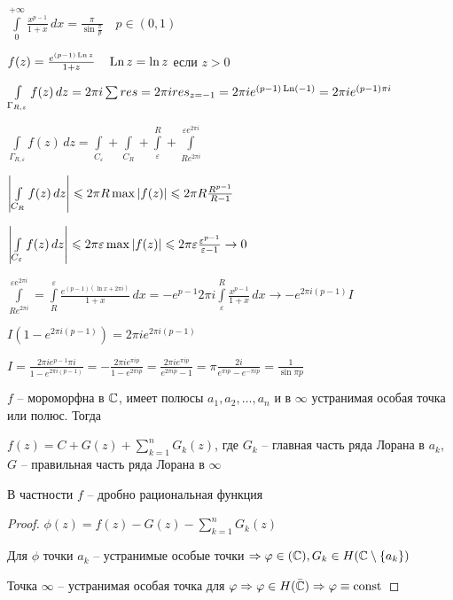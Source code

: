 \begin{example}\thmslashn
	
	$\int\limits_{0}^{+\infty}\frac{x^{p-1}}{1+x} \,dx = \frac{\pi}{\sin \frac{\pi}{p}}\quad p\in (0 ,1)$
	
	$f(z) = \frac{e^{(p-1)\operatorname{Ln} z}}{1+ z} \quad \operatorname{Ln} z = \ln z$ если $z > 0$ 
	
	$\int\limits_{\Gamma_{R, \varepsilon}} f(z)\,dz = 2\pi i \sum res = 2\pi i res_{z = -1} = 2\pi i e^{(p-1)\operatorname{Ln} (-1)} = 2\pi i e^{(p-1)\pi i}$
	
	$\int\limits_{\Gamma_{R, \varepsilon}} f(z)\,dz = \int\limits_{C_{\varepsilon}} + \int\limits_{C_R} + \int\limits_{\varepsilon}^R + \int\limits_{Re^{2\pi i}}^{\varepsilon e^{2\pi i}} $
	
	$\left|\int\limits_{C_R}f(z)\,dz\right| \leqslant 2\pi R \max{|f(z)|} \leqslant 2\pi R \frac{R^{p-1}}{R-1}$
	
	$\left|\int\limits_{C_\varepsilon}f(z)\,dz\right| \leqslant 2\pi \varepsilon \max{|f(z)|} \leqslant 2\pi \varepsilon \frac{\varepsilon^{p-1}}{\varepsilon-1} \to 0$
	
	$\int\limits_{Re^{2\pi i}}^{\varepsilon e^{2\pi i}} = \int\limits_{R}^{\varepsilon} \frac{e^{(p-1)(\ln x + 2\pi i)}}{1+ x}\,dx = -e^{p-1}2\pi i \int\limits_{\varepsilon}^{R} \frac{x^{p-1}}{1+x}\,dx \to -e^{2\pi i (p-1)} I$
	
	$I(1 - e^{2\pi i (p-1)}) = 2\pi i e^{2\pi i (p-1)}$
	
	$I = \frac{2\pi i e^{p-1}\pi i}{1 - e^{2\pi i (p-1)}} = -\frac{2\pi i e^{\pi i p}}{1 - e^{2\pi i p}} = \frac{2\pi i e^{\pi i p}}{e^{2\pi i p} - 1} = \pi \frac{2i}{e^{\pi i p} - e^{-\pi i p}} = \frac{1}{\sin \pi p}$
	
\end{example}

\begin{theorem}\thmslashn
	
	$f$ -- мороморфна в $\mathbb{C}$, имеет полюсы $a_1, a_2, \ldots, a_n$ и в $\infty$ устранимая особая точка или полюс. Тогда 
	
	$f(z) = C + G(z) + \sum\limits_{k = 1}^{n} G_k(z)$, где $G_k$ -- главная часть ряда Лорана в $a_k$, $G$ -- правильная часть ряда Лорана в $\infty$
	
	В частности $f$ -- дробно рациональная функция
	
\end{theorem}

\begin{proof}\thmslashn
	
	$\phi(z) = f(z) - G(z) - \sum\limits_{k = 1}^{n} G_k(z)$
	
	Для $\phi$ точки $a_k$ -- устранимые особые точки $\Rightarrow \varphi \in (\mathbb{C}), G_k\in H(\mathbb{C} \setminus \{a_k\})$
	
	Точка $\infty$ -- устранимая особая точка для $\varphi \Rightarrow \varphi \in H(\bar{\mathbb{C}}) \Rightarrow \varphi \equiv \text{const}$ 
	
\end{proof}

